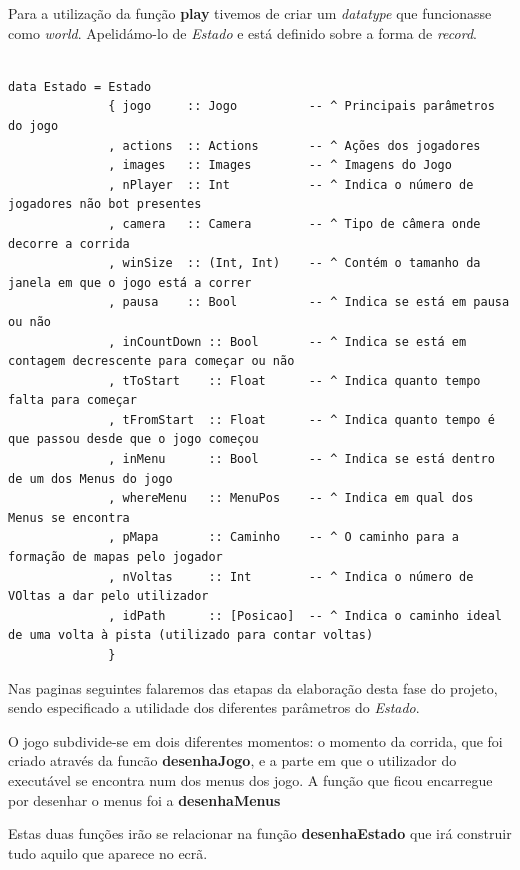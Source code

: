 \documentclass[a4paper]{report} %
\begin{document}
Para a utilização da função \textbf{play} tivemos de criar um \textit{datatype} que funcionasse como \emph{world}. Apelidámo-lo de \emph{Estado} e está definido sobre a forma de \textit{record}.

\scriptsize

\begin{verbatim}

data Estado = Estado
              { jogo     :: Jogo          -- ^ Principais parâmetros do jogo
              , actions  :: Actions       -- ^ Ações dos jogadores
              , images   :: Images        -- ^ Imagens do Jogo
              , nPlayer  :: Int           -- ^ Indica o número de jogadores não bot presentes
              , camera   :: Camera        -- ^ Tipo de câmera onde decorre a corrida
              , winSize  :: (Int, Int)    -- ^ Contém o tamanho da janela em que o jogo está a correr
              , pausa    :: Bool          -- ^ Indica se está em pausa ou não
              , inCountDown :: Bool       -- ^ Indica se está em contagem decrescente para começar ou não
              , tToStart    :: Float      -- ^ Indica quanto tempo falta para começar
              , tFromStart  :: Float      -- ^ Indica quanto tempo é que passou desde que o jogo começou
              , inMenu      :: Bool       -- ^ Indica se está dentro de um dos Menus do jogo
              , whereMenu   :: MenuPos    -- ^ Indica em qual dos Menus se encontra 
              , pMapa       :: Caminho    -- ^ O caminho para a formação de mapas pelo jogador
              , nVoltas     :: Int        -- ^ Indica o número de VOltas a dar pelo utilizador
              , idPath      :: [Posicao]  -- ^ Indica o caminho ideal de uma volta à pista (utilizado para contar voltas) 
              }

\end{verbatim}

\normalsize
Nas paginas seguintes falaremos das etapas da elaboração desta fase do projeto, sendo especificado a utilidade dos diferentes parâmetros do \emph{Estado}.

\newpage

O jogo subdivide-se em dois diferentes momentos: o momento da corrida, que foi criado através da funcão \textbf{desenhaJogo}, e a parte em que o utilizador do executável se encontra num dos menus dos jogo. A função que ficou encarregue por desenhar o menus foi a \textbf{desenhaMenus}

Estas duas funções irão se relacionar na função \textbf{desenhaEstado} que irá construir tudo aquilo que aparece no ecrã.
\end{document}
